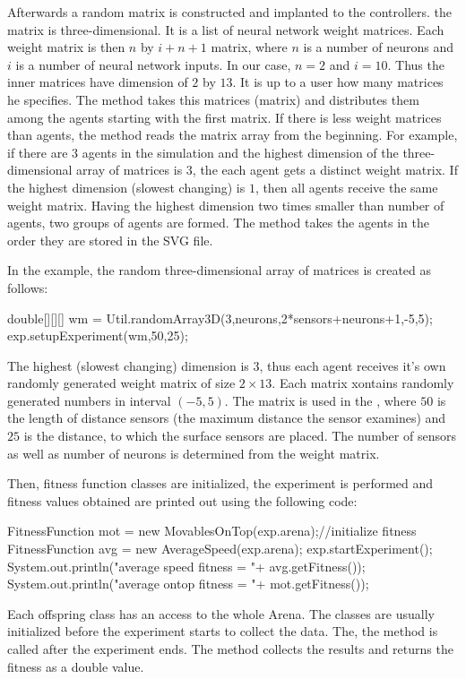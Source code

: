Afterwards a random matrix is constructed and implanted to the controllers. the matrix is three-dimensional. It is a list of neural network weight matrices. Each weight matrix is then $n$ by $i+n+1$ matrix, where $n$  is a number of neurons and $i$ is a number of neural network inputs. In our case, $n=2$ and $i=10$. Thus the inner matrices have dimension of $2$ by $13$. It is up to a user how many matrices he specifies. The  method takes this matrices (matrix) and distributes them among the agents starting with the first matrix. If there is less weight matrices than agents, the method reads the matrix array from the beginning. For example, if there are $3$ agents in the simulation and the highest dimension of the three-dimensional array of matrices is $3$, the each agent gets a distinct weight matrix. If the highest dimension (slowest changing) is $1$, then all agents receive the same weight matrix. Having the highest dimension two times smaller than number of agents, two groups of agents are formed. The method takes the agents in the order they are stored in the SVG file.

In the example, the random three-dimensional array of matrices is created as follows:
\begin{colorverbatim}
double[][][] wm = Util.randomArray3D(3,neurons,2*sensors+neurons+1,-5,5);
exp.setupExperiment(wm,50,25); 
\end{colorverbatim}
The highest (slowest changing) dimension is $3$, thus each agent receives it's own randomly generated weight matrix of size $2 \times 13$. Each matrix xontains randomly generated numbers in interval $(-5,5)$. The matrix is used in the , where $50$ is the length of distance sensors (the maximum distance the sensor examines) and $25$ is the distance, to which the surface sensors are placed. The number of sensors as well as number of neurons is determined from the weight matrix.

Then, fitness function classes are initialized, the experiment is performed and fitness values obtained are printed out using the following code:
\begin{colorverbatim}
FitnessFunction mot = new MovablesOnTop(exp.arena);//initialize fitness
FitnessFunction avg = new AverageSpeed(exp.arena);
exp.startExperiment();
System.out.println("average speed fitness = "+ avg.getFitness());
System.out.println("average ontop fitness = "+ mot.getFitness());
\end{colorverbatim}
Each  offspring class has an access to the whole Arena. The classes are usually initialized before the experiment starts to collect the data. The, the  method is called after the experiment ends. The method collects the results and returns the fitness as a double value.

